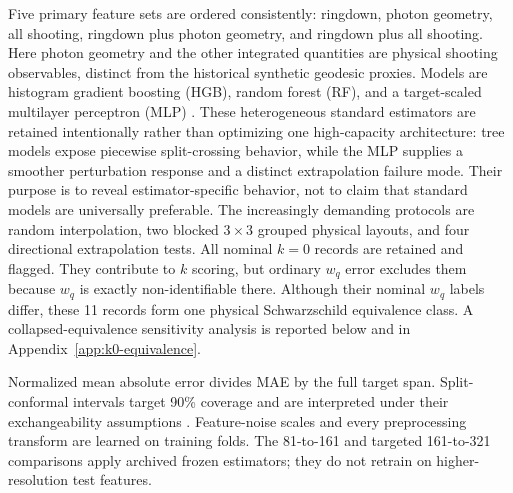 \documentclass[11pt]{article}
\newcommand{\wq}{w_q}
\begin{document}
Five primary feature sets are ordered consistently: ringdown, photon geometry,
all shooting, ringdown plus photon geometry, and ringdown plus all shooting.
Here photon geometry and the other integrated quantities are physical shooting
observables, distinct from the historical synthetic geodesic proxies.
Models are histogram gradient boosting (HGB), random forest (RF), and a
target-scaled multilayer perceptron (MLP) \cite{breiman2001random,friedman2001greedy,pedregosa2011scikit}.
These heterogeneous standard estimators are retained intentionally rather than
optimizing one high-capacity architecture: tree models expose piecewise
split-crossing behavior, while the MLP supplies a smoother perturbation
response and a distinct extrapolation failure mode. Their purpose is to reveal
estimator-specific behavior, not to claim that standard models are universally
preferable.
The increasingly demanding protocols are random interpolation, two blocked
$3\times3$ grouped physical layouts, and four directional extrapolation tests.
All nominal $k=0$ records
are retained and flagged. They contribute to $k$ scoring, but ordinary $\wq$
error excludes them because $\wq$ is exactly non-identifiable there. Although
their nominal $\wq$ labels differ, these 11 records form one physical
Schwarzschild equivalence class. A collapsed-equivalence sensitivity analysis
is reported below and in
Appendix~\ref{app:k0-equivalence}.

Normalized mean absolute error divides MAE by the full target span.
Split-conformal intervals target 90\% coverage and are interpreted under their
exchangeability assumptions \cite{vovk2005conformal,tibshirani2019covariate,angelopoulos2021guide}.
Feature-noise scales and every preprocessing transform are learned on training
folds. The 81-to-161 and targeted 161-to-321 comparisons apply archived frozen
estimators; they do not retrain on higher-resolution test features.
\end{document}
